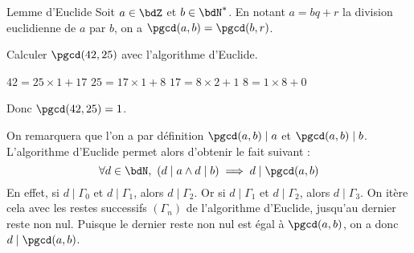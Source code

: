 \documentclass[a4paper,french,bookmarks]{article}
\begin{document}
\begin{corollary}{Lemme d'Euclide}{}
    Soit $a \in \bdZ$ et $b \in \bdN^*$. En notant $a = bq + r$ la division euclidienne de $a$ par $b$, on a $\pgcd(a, b) = \pgcd(b, r)$.
\end{corollary}


\begin{example}{}{}
    Calculer $\pgcd(42, 25)$ avec l'algorithme d'Euclide.
    \tcblower
    \begin{enumerate}
        \itb $42 = 25 \times 1 + 17$
        \itb $25 = 17 \times 1 + 8$
        \itb $17 = 8 \times 2 + 1$
        \itb $8 = 1 \times 8 + 0$
    \end{enumerate}
    Donc $\pgcd(42, 25) = 1$.
\end{example}

On remarquera que l'on a par définition $\pgcd(a, b)  \mid  a$ et $\pgcd(a, b)  \mid  b$. L'algorithme d'Euclide permet alors d'obtenir le fait suivant :
\[ \forall d \in \bdN, \ (d  \mid  a \land d  \mid  b) \implies d  \mid  \pgcd(a,b)\]
En effet, si $d  \mid  \Gamma_0$ et $d  \mid  \Gamma_1$, alors $ d  \mid  \Gamma_2$. Or si $d  \mid  \Gamma_1$ et $d  \mid  \Gamma_2$, alors $d  \mid  \Gamma_3$. On itère cela avec les restes successifs $\left(\Gamma_n\right)$ de l'algorithme d'Euclide, jusqu'au dernier reste non nul. Puisque le dernier reste non nul est égal à $\pgcd(a, b)$, on a donc $d  \mid  \pgcd(a, b)$.
\end{document}

